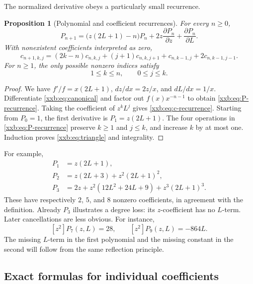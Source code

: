 \documentclass[11pt,a4paper]{article}
\numberwithin{equation}{section}
\newtheorem{proposition}[theorem]{Proposition}
\theoremstyle{definition}
\theoremstyle{remark}
\theoremstyle{plain}
\begin{document}
The normalized derivative obeys a particularly small recurrence.
\begin{proposition}[Polynomial and coefficient recurrences]\label{xxb:prop:recurrence}
For every $n\ge0$,
\begin{equation}\label{xxb:eq:P-recurrence}
 P_{n+1}=\bigl(z(2L+1)-n\bigr)P_n
          +2z\frac{\partial P_n}{\partial z}
          +\frac{\partial P_n}{\partial L}.
\end{equation}
With nonexistent coefficients interpreted as zero,
\begin{equation}\label{xxb:eq:c-recurrence}
 \boxed{\;
 c_{n+1,k,j}=(2k-n)c_{n,k,j}+(j+1)c_{n,k,j+1}
             +c_{n,k-1,j}+2c_{n,k-1,j-1}.
 \;}
\end{equation}
For $n\ge1$, the only possible nonzero indices satisfy
\begin{equation}\label{xxb:eq:triangle}
 1\le k\le n,\qquad 0\le j\le k.
\end{equation}
\end{proposition}
\begin{proof}
We have $f'/f=x(2L+1)$, $dz/dx=2z/x$, and $dL/dx=1/x$.
Differentiate \eqref{xxb:eq:canonical} and factor out $f(x)x^{-n-1}$ to obtain
\eqref{xxb:eq:P-recurrence}. Taking the coefficient of $z^kL^j$ gives
\eqref{xxb:eq:c-recurrence}. Starting from $P_0=1$, the first derivative is
$P_1=z(2L+1)$. The four operations in \eqref{xxb:eq:P-recurrence} preserve
$k\ge1$ and $j\le k$, and increase $k$ by at most one. Induction proves
\eqref{xxb:eq:triangle} and integrality.
\end{proof}

For example,
\begin{align*}
 P_1&=z(2L+1),\\
 P_2&=z(2L+3)+z^2(2L+1)^2,\\
 P_3&=2z+z^2(12L^2+24L+9)+z^3(2L+1)^3.
\end{align*}
These have respectively $2$, $5$, and $8$ nonzero coefficients, in
agreement with the definition. Already $P_3$ illustrates a degree loss:
its $z$-coefficient has no $L$-term. Later cancellations are less obvious.
For instance,
\begin{equation}\label{xxb:eq:examples-cancel}
 [z^2]P_7(z,L)=28,\qquad [z^2]P_9(z,L)=-864L.
\end{equation}
The missing $L$-term in the first polynomial and the missing constant in
the second will follow from the same reflection principle.

\subsection{Exact formulas for individual coefficients}\label{xxb:sec:formulas}
\end{document}
